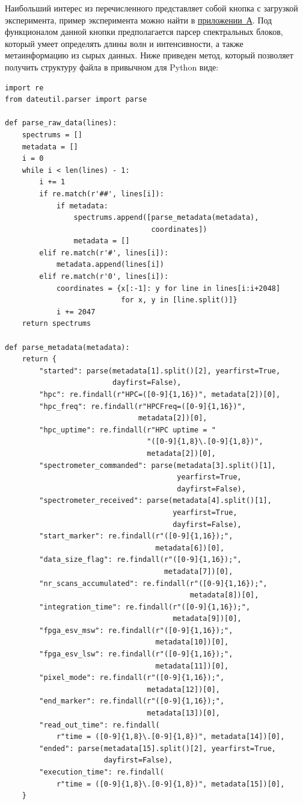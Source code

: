 Наибольший интерес из перечисленного представляет собой кнопка с загрузкой эксперимента, пример эксперимента можно найти в
\hyperref[app:app1]{приложении~А}. Под функционалом данной кнопки предполагается парсер спектральных блоков,
который умеет определять длины волн и интенсивности, а также метаинформацию из сырых данных. Ниже приведен
метод, который позволяет получить структуру файла в привычном для Python виде:
\begin{lstlisting}[style=py]
import re
from dateutil.parser import parse

def parse_raw_data(lines):
    spectrums = []
    metadata = []
    i = 0
    while i < len(lines) - 1:
        i += 1
        if re.match(r'##', lines[i]):
            if metadata:
                spectrums.append([parse_metadata(metadata),
                                  coordinates])
                metadata = []
        elif re.match(r'#', lines[i]):
            metadata.append(lines[i])
        elif re.match(r'0', lines[i]):
            coordinates = {x[:-1]: y for line in lines[i:i+2048]
                           for x, y in [line.split()]}
            i += 2047
    return spectrums

def parse_metadata(metadata):
    return {
        "started": parse(metadata[1].split()[2], yearfirst=True,
                         dayfirst=False),
        "hpc": re.findall(r"HPC=([0-9]{1,16})", metadata[2])[0],
        "hpc_freq": re.findall(r"HPCFreq=([0-9]{1,16})",
                               metadata[2])[0],
        "hpc_uptime": re.findall(r"HPC uptime = "
                                 "([0-9]{1,8}\.[0-9]{1,8})",
                                 metadata[2])[0],
        "spectrometer_commanded": parse(metadata[3].split()[1],
                                        yearfirst=True,
                                        dayfirst=False),
        "spectrometer_received": parse(metadata[4].split()[1],
                                       yearfirst=True,
                                       dayfirst=False),
        "start_marker": re.findall(r"([0-9]{1,16});",
                                   metadata[6])[0],
        "data_size_flag": re.findall(r"([0-9]{1,16});",
                                     metadata[7])[0],
        "nr_scans_accumulated": re.findall(r"([0-9]{1,16});",
                                           metadata[8])[0],
        "integration_time": re.findall(r"([0-9]{1,16});",
                                       metadata[9])[0],
        "fpga_esv_msw": re.findall(r"([0-9]{1,16});",
                                   metadata[10])[0],
        "fpga_esv_lsw": re.findall(r"([0-9]{1,16});",
                                   metadata[11])[0],
        "pixel_mode": re.findall(r"([0-9]{1,16});",
                                 metadata[12])[0],
        "end_marker": re.findall(r"([0-9]{1,16});",
                                 metadata[13])[0],
        "read_out_time": re.findall(
            r"time = ([0-9]{1,8}\.[0-9]{1,8})", metadata[14])[0],
        "ended": parse(metadata[15].split()[2], yearfirst=True,
                       dayfirst=False),
        "execution_time": re.findall(
            r"time = ([0-9]{1,8}\.[0-9]{1,8})", metadata[15])[0],
    }
\end{lstlisting}
